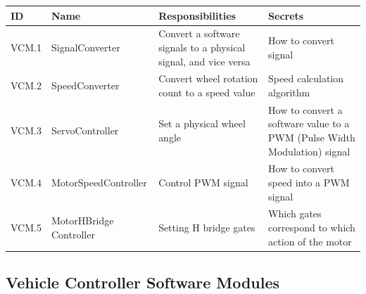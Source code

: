 \documentclass [10pt]{article}
\begin{document}
\begin{longtable}{ |p{ }  | p{ } |  p{ } |  p{ } |}  \hline
    
    \textbf{ID} & \textbf{Name} &  \textbf{Responsibilities} & \textbf{Secrets} \\ \hline
    
    \cellcolor{tableCell}VCM.1  & \cellcolor{tableCell}SignalConverter & \cellcolor{tableCell}Convert a software signals to a physical signal, and vice versa & \cellcolor{tableCell}How to convert signal  \\ \hline
    
    VCM.2 & SpeedConverter & Convert wheel rotation count to a speed value & Speed calculation algorithm \\ \hline
    
    \cellcolor{tableCell}VCM.3  & \cellcolor{tableCell}ServoController & \cellcolor{tableCell}Set a physical wheel angle & 
    \cellcolor{tableCell}How to convert a software value to a PWM (Pulse Width Modulation) signal \\ \hline
    
    VCM.4 & MotorSpeedController & Control PWM signal & How to convert speed into a PWM signal \\ \hline
    
    \cellcolor{tableCell}VCM.5  & \cellcolor{tableCell}MotorHBridge \newline Controller & \cellcolor{tableCell}Setting H bridge gates & \cellcolor{tableCell}Which gates correspond to which action of the motor  \\ \hline
    
    
\end{longtable}


\subsection{Vehicle Controller Software Modules}
\end{document}
